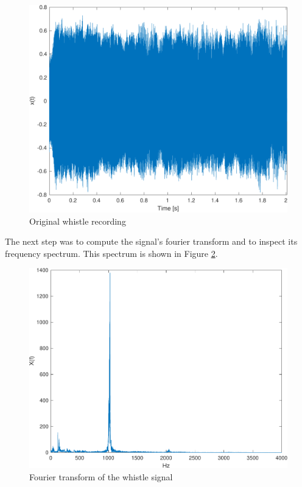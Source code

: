 \documentclass{IEEEtran}
\begin{document}
\begin{figure}[h]
  \centering
  \captionsetup{justification=centering}

  \includegraphics[width=0.8\columnwidth]{pictures/whistle_orig.pdf}
  \caption{Original whistle recording}
  \label{1:whistle_orig}

\end{figure}

The next step was to compute the signal's fourier transform and to
inspect its frequency spectrum. This spectrum is shown in Figure
\ref{1:whistle_fft}.

\begin{figure}[h]
  \centering
  \captionsetup{justification=centering}

  \includegraphics[width=0.8\columnwidth]{pictures/whistle_fft.pdf}
  \caption{Fourier transform of the whistle signal}
  \label{1:whistle_fft}

\end{figure}
\end{document}

